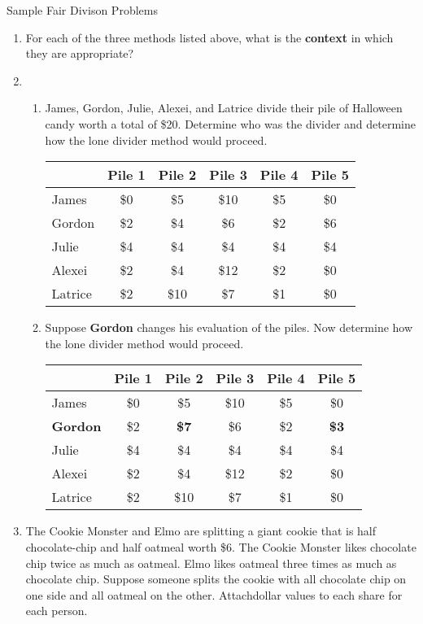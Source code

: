 \documentclass[12pt]{article}
\begin{document}
\begin{center} {\Large{Sample Fair Divison Problems}}  \end{center}
\begin{enumerate}
\item For each of the three methods listed above, what is the \textbf{context} in which they are appropriate?

\item
\begin{enumerate}
\item James, Gordon, Julie, Alexei, and Latrice divide their pile of Halloween candy worth a total of \$20. Determine who was the divider and determine how the lone divider method would proceed.\\

\begin{tabular}{l || c | c | c| c| c}
&Pile 1&Pile 2&Pile 3&Pile 4&Pile 5\\
\hline \hline
James&\$0&\$5&\$10&\$5&\$0\\ \hline
Gordon&\$2&\$4&\$6&\$2&\$6\\ \hline
Julie&\$4&\$4&\$4&\$4&\$4\\ \hline
Alexei&\$2&\$4&\$12&\$2&\$0\\ \hline
Latrice&\$2&\$10&\$7&\$1&\$0\\ 
\end{tabular}
\vfill
	\item Suppose \textbf{Gordon} changes his evaluation of the piles. Now determine how the lone divider method would proceed.\\
	\begin{tabular}{l || c | c | c| c| c}
&Pile 1&Pile 2&Pile 3&Pile 4&Pile 5\\
\hline \hline
James&\$0&\$5&\$10&\$5&\$0\\ \hline
\textbf{Gordon}&\$2&\textbf{\$7}&\$6&\$2&\textbf{\$3}\\ \hline
Julie&\$4&\$4&\$4&\$4&\$4\\ \hline
Alexei&\$2&\$4&\$12&\$2&\$0\\ \hline
Latrice&\$2&\$10&\$7&\$1&\$0\\ 
\end{tabular}
	\end{enumerate}
\vfill
\newpage

\item The Cookie Monster and Elmo are splitting a giant cookie that is half chocolate-chip and half oatmeal worth \$6. The Cookie Monster likes chocolate chip twice as much as oatmeal. Elmo likes oatmeal three times as much as chocolate chip. Suppose someone splits the cookie with all chocolate chip on one side and all oatmeal on the other. Attachdollar values to each share for each person.\\



\end{enumerate}
\end{document}
